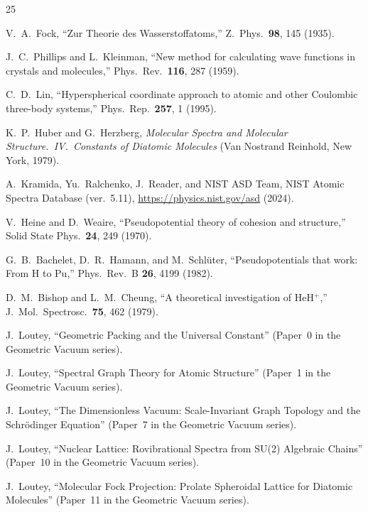 \documentclass[aps,pra,twocolumn,superscriptaddress,longbibliography,floatfix]{revtex4-2}
\begin{document}
\begin{thebibliography}{25}

V.~A.~Fock,
``Zur Theorie des Wasserstoffatoms,''
Z.~Phys.\ \textbf{98}, 145 (1935).

J.~C.~Phillips and L.~Kleinman,
``New method for calculating wave functions in crystals and molecules,''
Phys.\ Rev.\ \textbf{116}, 287 (1959).

C.~D.~Lin,
``Hyperspherical coordinate approach to atomic and other
Coulombic three-body systems,''
Phys.\ Rep.\ \textbf{257}, 1 (1995).

K.~P.~Huber and G.~Herzberg,
\emph{Molecular Spectra and Molecular Structure.\ IV.\ Constants of
Diatomic Molecules}
(Van Nostrand Reinhold, New York, 1979).

A.~Kramida, Yu.~Ralchenko, J.~Reader, and NIST ASD Team,
NIST Atomic Spectra Database (ver.~5.11),
\url{https://physics.nist.gov/asd} (2024).

V.~Heine and D.~Weaire,
``Pseudopotential theory of cohesion and structure,''
Solid State Phys.\ \textbf{24}, 249 (1970).

G.~B.~Bachelet, D.~R.~Hamann, and M.~Schl\"uter,
``Pseudopotentials that work: From H to Pu,''
Phys.\ Rev.\ B \textbf{26}, 4199 (1982).

D.~M.~Bishop and L.~M.~Cheung,
``A theoretical investigation of HeH$^+$,''
J.~Mol.\ Spectrosc.\ \textbf{75}, 462 (1979).

J.~Loutey,
``Geometric Packing and the Universal Constant''
(Paper~0 in the Geometric Vacuum series).

J.~Loutey,
``Spectral Graph Theory for Atomic Structure''
(Paper~1 in the Geometric Vacuum series).

J.~Loutey,
``The Dimensionless Vacuum: Scale-Invariant Graph Topology
and the Schr\"odinger Equation''
(Paper~7 in the Geometric Vacuum series).

J.~Loutey,
``Nuclear Lattice: Rovibrational Spectra from SU(2) Algebraic
Chains'' (Paper~10 in the Geometric Vacuum series).

J.~Loutey,
``Molecular Fock Projection: Prolate Spheroidal Lattice
for Diatomic Molecules''
(Paper~11 in the Geometric Vacuum series).


\end{thebibliography}
\end{document}
